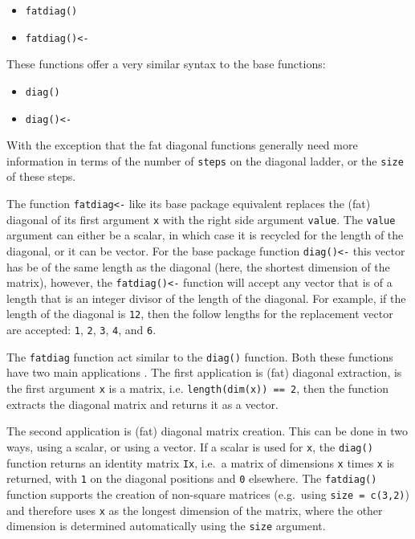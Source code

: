 \documentclass[article]{jss}
\begin{document}
\begin{itemize}
\itemsep1pt\parskip0pt
\item
  \texttt{fatdiag()}
\item
  \texttt{fatdiag()\textless{}-}
\end{itemize}

These functions offer a very similar syntax to the base functions:

\begin{itemize}
\itemsep1pt\parskip0pt
\item
  \texttt{diag()}
\item
  \texttt{diag()\textless{}-}
\end{itemize}

With the exception that the fat diagonal functions generally need more
information in terms of the number of \texttt{steps} on the diagonal
ladder, or the \texttt{size} of these steps.

The function \texttt{fatdiag\textless{}-} like its base package
equivalent replaces the (fat) diagonal of its first argument \texttt{x}
with the right side argument \texttt{value}. The \texttt{value} argument
can either be a scalar, in which case it is recycled for the length of
the diagonal, or it can be vector. For the base package function
\texttt{diag()\textless{}-} this vector has be of the same length as the
diagonal (here, the shortest dimension of the matrix), however, the
\texttt{fatdiag()\textless{}-} function will accept any vector that is
of a length that is an integer divisor of the length of the diagonal.
For example, if the length of the diagonal is \texttt{12}, then the
follow lengths for the replacement vector are accepted: \texttt{1},
\texttt{2}, \texttt{3}, \texttt{4}, and \texttt{6}.

The \texttt{fatdiag} function act similar to the \texttt{diag()}
function. Both these functions have two main applications . The first
application is (fat) diagonal extraction, is the first argument
\texttt{x} is a matrix, i.e. \texttt{length(dim(x)) == 2}, then the
function extracts the diagonal matrix and returns it as a vector.

The second application is (fat) diagonal matrix creation. This can be
done in two ways, using a scalar, or using a vector. If a scalar is used
for \texttt{x}, the \texttt{diag()} function returns an identity matrix
\texttt{Ix}, i.e.~a matrix of dimensions \texttt{x} times \texttt{x} is
returned, with \texttt{1} on the diagonal positions and \texttt{0}
elsewhere. The \texttt{fatdiag()} function supports the creation of
non-square matrices (e.g.~using \texttt{size = c(3,2)}) and therefore
uses \texttt{x} as the longest dimension of the matrix, where the other
dimension is determined automatically using the \texttt{size} argument.
\end{document}
